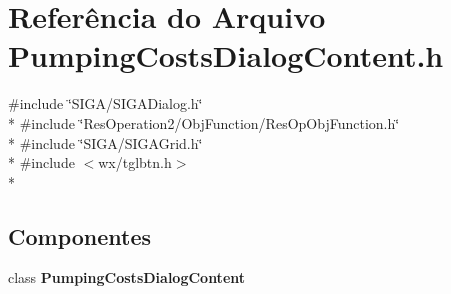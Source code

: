 \section{Referência do Arquivo Pumping\+Costs\+Dialog\+Content.\+h}
\label{_2_obj_function_2_pumping_costs_2_pumping_costs_dialog_content_8h}
{\ttfamily \#include \char`\"{}S\+I\+G\+A/\+S\+I\+G\+A\+Dialog.\+h\char`\"{}}\\*
{\ttfamily \#include \char`\"{}Res\+Operation2/\+Obj\+Function/\+Res\+Op\+Obj\+Function.\+h\char`\"{}}\\*
{\ttfamily \#include \char`\"{}S\+I\+G\+A/\+S\+I\+G\+A\+Grid.\+h\char`\"{}}\\*
{\ttfamily \#include $<$wx/tglbtn.\+h$>$}\\*
\subsection*{Componentes}
\begin{DoxyCompactItemize}
\item 
class {\bf Pumping\+Costs\+Dialog\+Content}
\end{DoxyCompactItemize}
